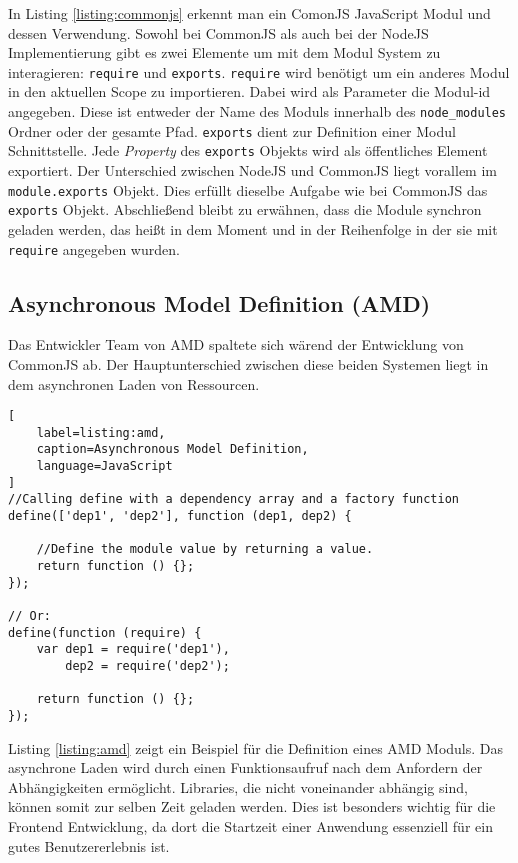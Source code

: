 In Listing \ref{listing:commonjs} erkennt man ein ComonJS JavaScript Modul und dessen Verwendung. Sowohl bei CommonJS als auch bei der NodeJS Implementierung gibt es zwei Elemente um mit dem Modul System zu interagieren: \lstinline{require} und \lstinline{exports}. \lstinline{require} wird benötigt um ein anderes Modul in den aktuellen Scope zu importieren. Dabei wird als Parameter die Modul-id angegeben. Diese ist entweder der Name des Moduls innerhalb des \lstinline{node_modules} Ordner oder der gesamte Pfad. \lstinline{exports} dient zur Definition einer Modul Schnittstelle. Jede \textit{Property} des \lstinline{exports} Objekts wird als öffentliches Element exportiert. Der Unterschied zwischen NodeJS und CommonJS liegt vorallem im \lstinline{module.exports} Objekt. Dies erfüllt dieselbe Aufgabe wie bei CommonJS das \lstinline{exports} Objekt. Abschließend bleibt zu erwähnen, dass die Module synchron geladen werden, das heißt in dem Moment und in der Reihenfolge in der sie mit \lstinline{require} angegeben wurden.\autocite{SebastianPeyrott}

\subsection{Asynchronous Model Definition (AMD)}

Das Entwickler Team von AMD spaltete sich wärend der Entwicklung von CommonJS ab. Der Hauptunterschied zwischen diese beiden Systemen liegt in dem asynchronen Laden von Ressourcen. \autocite{SebastianPeyrott}

\begin{lstlisting}[
    label=listing:amd,
	caption=Asynchronous Model Definition,
	language=JavaScript
]
//Calling define with a dependency array and a factory function
define(['dep1', 'dep2'], function (dep1, dep2) {

    //Define the module value by returning a value.
    return function () {};
});

// Or:
define(function (require) {
    var dep1 = require('dep1'),
        dep2 = require('dep2');

    return function () {};
});
\end{lstlisting}

Listing \ref{listing:amd} zeigt ein Beispiel für die Definition eines AMD Moduls. Das asynchrone Laden wird durch einen Funktionsaufruf nach dem Anfordern der Abhängigkeiten ermöglicht. Libraries, die nicht voneinander abhängig sind, können somit zur selben Zeit geladen werden. Dies ist besonders wichtig für die Frontend Entwicklung, da dort die Startzeit einer Anwendung essenziell für ein gutes Benutzererlebnis ist. \autocite{SebastianPeyrott}

